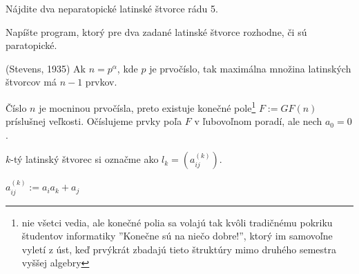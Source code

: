 \begin{exercise}
Nájdite dva neparatopické latinské štvorce rádu 5.
\end{exercise}

\begin{exercise}
Napíšte program, ktorý pre dva zadané latinské štvorce rozhodne, či sú paratopické.
\end{exercise}


\begin{theorem}{(Stevens, 1935)}
\label{thm:stevens}
Ak $n = p^\alpha$, kde $p$ je prvočíslo, tak maximálna množina latinských štvorcov má $n-1$ prvkov.
\end{theorem}

\begin{construction}
Číslo $n$ je mocninou prvočísla, preto existuje konečné pole\footnote{nie všetci vedia, ale konečné polia sa volajú tak kvôli tradičnému pokriku študentov informatiky ''Konečne sú na niečo dobre!'', ktorý im samovoľne vyletí z úst, keď prvýkrát zbadajú tieto štruktúry mimo druhého semestra vyššej algebry} $F := GF(n)$ príslušnej veľkosti. 
Očíslujeme prvky poľa $F$ v ľubovoľnom poradí, ale nech $a_0 = 0$.

$k$-tý latinský štvorec si označme ako $l_k = \left(a_{ij}^{(k)}\right)$.

$a_{ij}^{(k)} := a_i a_k + a_j$
\end{construction}


